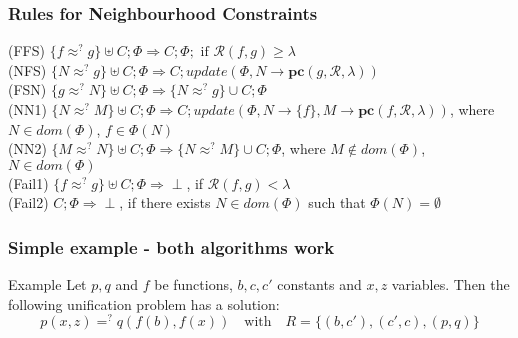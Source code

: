 		
		\begin{frame}[fragile=singleslide]
	\frametitle{Rules for Neighbourhood Constraints}
		\textcolor[rgb]{0.55,0,0}{(FFS)} $\{f \approx^? g\} \uplus C; \Phi \Rightarrow  C; \Phi; \text{ if } \mathcal{R}(f,g)\geq \lambda$ \\
		\vspace{0.3cm}
		\textcolor[rgb]{0.55,0,0}{(NFS)} $\{N \approx^? g\} \uplus C; \Phi \Rightarrow  C; update(\Phi,N\rightarrow \textbf{pc}(g,\mathcal{R},\lambda))$  \\
		\vspace{0.3cm}
		\textcolor[rgb]{0.55,0,0}{(FSN)} $\{g \approx^? N\} \uplus C; \Phi \Rightarrow  \{N \approx^? g\} \cup C;\Phi$  \\
		\vspace{0.3cm}
		\textcolor[rgb]{0.55,0,0}{(NN1)} $\{N \approx^? M\} \uplus C; \Phi \Rightarrow  C; update(\Phi,N\rightarrow \{f\}, M\rightarrow \textbf{pc}(f,\mathcal{R},\lambda))$, where $N \in dom(\Phi )$, $f\in \Phi(N)$ \\
		\vspace{0.3cm}
		\textcolor[rgb]{0.55,0,0}{(NN2)} $\{M \approx^? N\} \uplus C; \Phi \Rightarrow  \{N \approx^? M\} \cup C;\Phi$, where $M \notin dom(\Phi )$, $N\in dom(\Phi)$ \\
		\vspace{0.3cm}
		\textcolor[rgb]{0.55,0,0}{(Fail1)} $\{f \approx^? g\} \uplus C; \Phi \Rightarrow  \perp$, if $\mathcal{R}(f,g) < \lambda$ \\
		\vspace{0.3cm}
		\textcolor[rgb]{0.55,0,0}{(Fail2)} $C; \Phi \Rightarrow  \perp$, if there exists $N \in dom(\Phi )$ such that $\Phi (N)=\emptyset$ \\
		\vspace{0.3cm}
	
  \end{frame}	


	\begin{frame}[fragile=singleslide]
	\frametitle{Simple example - both algorithms work}
	\begin{exampleblock}{Example}
	Let $p,q$ and $f$ be functions, $b,c,c'$ constants and $x,z$ variables. Then the following unification problem has a solution:\\
	\[p(x,z) =^? q(f(b),f(x)) \quad \text{with}\quad R=\{(b,c'),(c',c),(p,q)\}\]\\
	\end{exampleblock}
	\end{frame}
	
